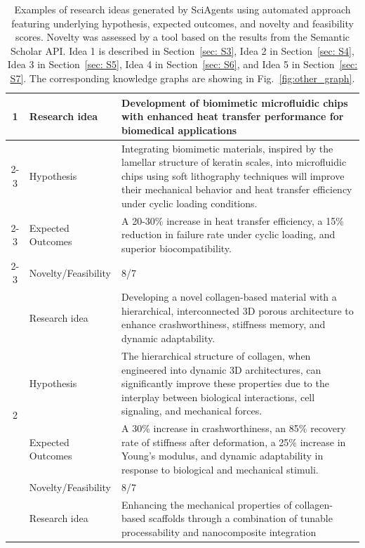 \documentclass{article}
\begin{document}
\begin{table}[th!]
\centering
\caption{Examples of research ideas generated by SciAgents using automated approach featuring underlying hypothesis, expected outcomes, and novelty and feasibility scores. Novelty was assessed by a tool based on the results from the Semantic Scholar API. Idea 1 is described in Section~\ref{sec: S3}, Idea 2 in Section~\ref{sec: S4}, Idea 3 in Section~\ref{sec: S5}, Idea 4 in Section~\ref{sec: S6}, and Idea 5 in Section~\ref{sec: S7}. The corresponding knowledge graphs are showing in Fig.~\ref{fig:other_graph}.}
\begin{tabularx}{\textwidth}{|c|m{}|m{}|}
\hline
\multirow{9}{*}{1}  
& Research idea & Development of biomimetic microfluidic chips with enhanced heat transfer performance for biomedical applications  
\\
\cline{2-3}
& Hypothesis & Integrating biomimetic materials, inspired by the lamellar structure of keratin scales, into microfluidic chips using soft lithography techniques will improve their mechanical behavior and heat transfer efficiency under cyclic loading conditions. 
\\
\cline{2-3}
& Expected Outcomes & A 20-30\% increase in heat transfer efficiency, a 15\% reduction in failure rate under cyclic loading, and superior biocompatibility.
\\
\cline{2-3}
& Novelty/Feasibility & 8/7  
\\
\hline
\multirow{9}{*}{2}  
& Research idea & Developing a novel collagen-based material with a hierarchical, interconnected 3D porous architecture to enhance crashworthiness, stiffness memory, and dynamic
adaptability.
\\
\cline{2-3}
& Hypothesis & The hierarchical structure of collagen, when engineered into dynamic 3D architectures, can significantly improve these properties due to the interplay
between biological interactions, cell signaling, and mechanical forces.
\\
\cline{2-3}
& Expected Outcomes & A 30\% increase in crashworthiness, an 85\% recovery rate of stiffness after deformation, a 25\% increase in Young's modulus, and dynamic adaptability in response to biological and mechanical stimuli.
\\
\cline{2-3}
& Novelty/Feasibility & 8/7  
\\
\hline
\multirow{9}{*}{3}  
& Research idea & Enhancing the mechanical properties of collagen-based scaffolds through a combination of tunable processability and nanocomposite integration

\end{tabularx}
\end{table}
\end{document}

